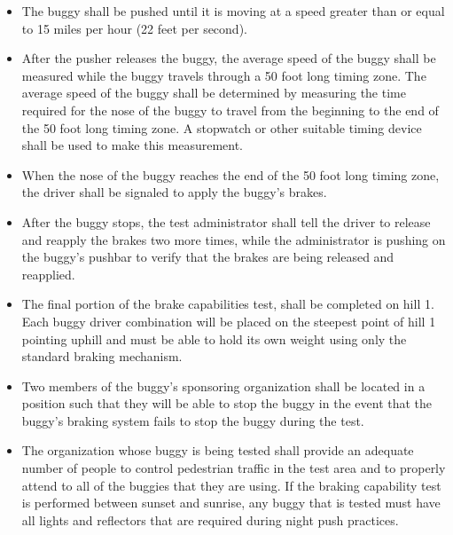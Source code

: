 	\begin{itemize}

		\item
		The buggy shall be pushed until it is moving at a speed greater than or equal
		to 15 miles per hour (22 feet per second).

		\item
		After the pusher releases the buggy, the average speed of the buggy shall be
		measured while the buggy travels through a 50 foot long timing zone. The
		average speed of the buggy shall be determined by measuring the time required
		for the nose of the buggy to travel from the beginning to the end of the 50
		foot long timing zone. A stopwatch or other suitable timing device shall be
		used to make this measurement.

		\item
		When the nose of the buggy reaches the end of the 50 foot long timing zone, the
		driver shall be signaled to apply the buggy's brakes.

		\item
		After the buggy stops, the test administrator shall tell the driver to release
		and reapply the brakes two more times, while the administrator is pushing on
		the buggy's pushbar to verify that the brakes are being released and reapplied.

		\item
		The final portion of the brake capabilities test, shall be completed on hill 1.
		Each buggy driver combination will be placed on the steepest point of hill 1
		pointing uphill and must be able to hold its own weight using only the standard
		braking mechanism.

		\item
		Two members of the buggy's sponsoring organization shall be located in a
		position such that they will be able to stop the buggy in the event that the
		buggy's braking system fails to stop the buggy during the test.

		\item
		The organization whose buggy is being tested shall provide an adequate number
		of people to control pedestrian traffic in the test area and to properly attend
		to all of the buggies that they are using. If the braking capability test is
		performed between sunset and sunrise, any buggy that is tested must have all
		lights and reflectors that are required during night push practices.

	\end{itemize}

